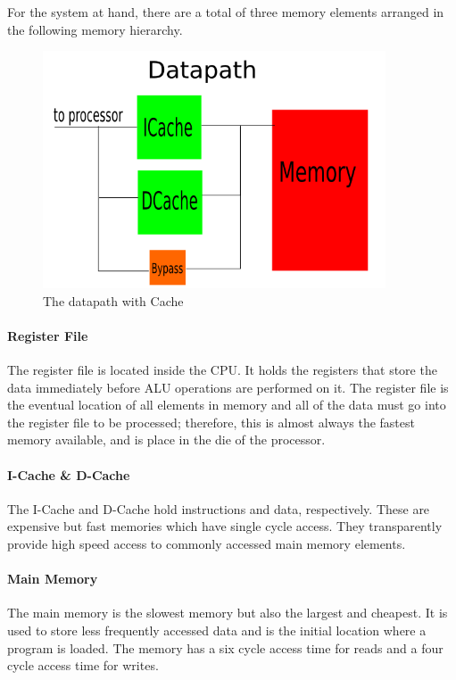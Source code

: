 \documentclass[11pt,letterpaper,]{article}
\begin{document}
For the system at hand, there are a total of three memory elements arranged in the following memory hierarchy.

\begin{figure}[ht]
  \centering
  \includegraphics[width=4in]{img/datapath.png}
  \caption{ The datapath with Cache}
  \label{fig:datapath}
\end{figure}

\paragraph{Register File}
The register file is located inside the CPU.  It holds the registers that store the data immediately before ALU operations are performed on it.  The register file is the eventual location of all elements in memory and all of the data must go into the register file to be processed; therefore, this is almost always the fastest memory available, and is place in the die of the processor.

\paragraph{I-Cache \& D-Cache}
The I-Cache and D-Cache hold instructions and data, respectively.  These are expensive but fast memories which have single cycle access.  They transparently provide high speed access to commonly accessed main memory elements. 

\paragraph{Main Memory}
The main memory is the slowest memory but also the largest and cheapest.  It is used to store less frequently accessed data and is the initial location where a program is loaded.  The memory has a six cycle access time for reads and a four cycle access time for writes. 
\end{document}
